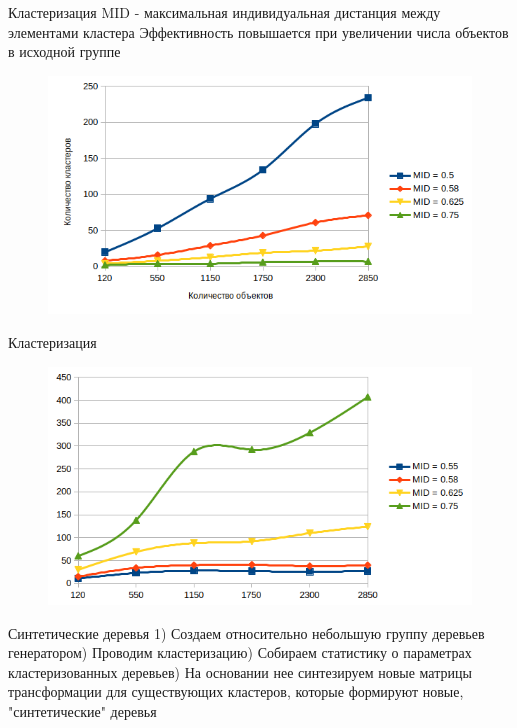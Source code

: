 \documentclass[14pt]{beamer}
\begin{document}
\begin{frame}{Кластеризация}
MID - максимальная индивидуальная дистанция между элементами
кластера 
Эффективность повышается при увеличении числа объектов в исходной группе
\begin{figure}[hbtp]
\includegraphics[scale=0.58]{stat2.png}
\end{figure}
\end{frame}
\begin{frame}{Кластеризация}
\begin{figure}[hbtp]
\includegraphics[scale=0.6]{stat3.png}
\end{figure}
\end{frame}
\begin{frame}{Синтетические деревья}
1) Создаем относительно небольшую группу деревьев генератором) Проводим кластеризацию) Собираем статистику о параметрах кластеризованных деревьев) На основании нее синтезируем новые матрицы трансформации для существующих кластеров, которые формируют новые, "синтетические" деревья
\end{frame}
\end{document}
